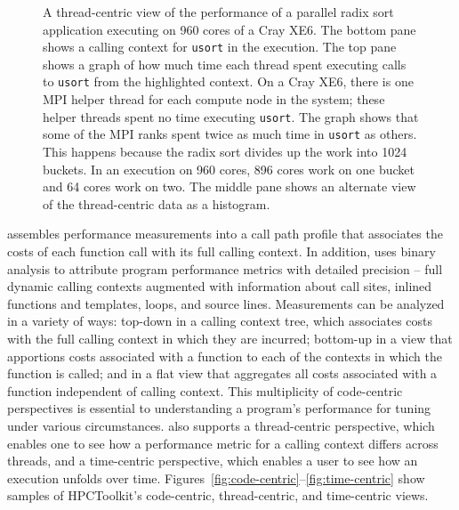 \documentclass[11pt,twoside,letterpaper]{report}
\begin{document}
\begin{figure}[t]
\caption{A thread-centric view of the performance of a parallel radix sort application executing on 960 cores of a Cray XE6. The bottom pane shows a calling context for {\tt usort} in the execution. The top pane shows a graph of how much time each thread spent executing calls to {\tt usort} from the   highlighted context.  On a Cray XE6, there is one MPI helper thread for each compute node in the system; these helper threads spent no time executing {\tt usort}. The graph shows that some of the MPI ranks spent twice as much time in {\tt usort} as others. This happens because the radix sort divides up the work into 1024 buckets. In an execution on 960 cores,  896 cores work on one bucket and 64 cores work on two. The middle pane shows an alternate view of the thread-centric data as a histogram.}
\label{fig:thread-centric}
\end{figure}

\HPCToolkit{} assembles performance measurements into a call path profile that associates the costs of each function call with its full calling context.
In addition, \HPCToolkit{} uses binary analysis to attribute program performance metrics with detailed precision -- full dynamic calling contexts augmented with information about call sites, inlined functions and templates, loops, and source lines.
Measurements can be analyzed in a variety of ways: top-down in a calling context tree, which associates costs with the full calling context in which they are incurred; bottom-up in a view that apportions costs associated with a function to each of the contexts in which the function is called; and in a flat view that aggregates all costs associated with a function independent of calling context.
This multiplicity of code-centric perspectives is essential to understanding a program's performance for tuning under various circumstances.
\HPCToolkit{} also supports a thread-centric perspective, which enables one to see how a performance metric for a calling context differs across threads, and a time-centric perspective, which enables a user to see how an execution unfolds over time. Figures~\ref{fig:code-centric}--\ref{fig:time-centric} show samples of HPCToolkit's code-centric, thread-centric, and time-centric views.
\end{document}

